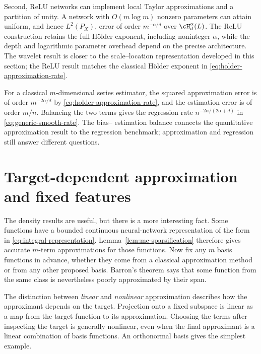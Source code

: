 \documentclass[11pt,twoside]{article}
\theoremstyle{definition}
\theoremstyle{remark}
\begin{document}
Second, ReLU networks can implement local Taylor approximations and a
partition of unity. A network with \(O(m\log m)\) nonzero parameters can attain
uniform, and hence \(L^2(P_X)\), error of order \(m^{-\alpha/d}\) over
\(\cH_d^\alpha(L)\). The ReLU construction retains the full H\"older exponent,
including noninteger \(\alpha\), while the depth and logarithmic parameter
overhead depend on the precise architecture. The wavelet result is closer to
the scale--location representation developed in this section; the ReLU result
matches the classical H\"older exponent in
\cref{eq:holder-approximation-rate}.

For a classical \(m\)-dimensional series estimator, the squared approximation
error is of order \(m^{-2\alpha/d}\) by
\cref{eq:holder-approximation-rate}, and the estimation error is of order
\(m/n\). Balancing the two terms gives the regression rate
\(n^{-2\alpha/(2\alpha+d)}\) in \cref{eq:generic-smooth-rate}. The bias--
estimation balance connects the quantitative approximation result to the
regression benchmark; approximation and regression still answer different
questions.

\section{Target-dependent approximation and fixed features}
\label{sec:adaptive-fixed-features}

The density results are useful, but there is a more interesting fact. Some
functions have a bounded continuous neural-network representation of the form
in \cref{eq:integral-representation}. Lemma~\ref{lem:mc-sparsification}
therefore gives accurate \(m\)-term approximations for those functions. Now fix
any \(m\) basis functions in advance, whether they come from a classical
approximation method or from any other proposed basis. Barron's theorem says
that some function from the same class is nevertheless poorly approximated by
their span.

The distinction between \emph{linear} and \emph{nonlinear} approximation
describes how the approximant depends on the target. Projection onto a fixed
subspace is linear as a map from the target function to its approximation.
Choosing the terms after inspecting the target is generally nonlinear, even
when the final approximant is a linear combination of basis functions. An
orthonormal basis gives the simplest example.
\end{document}
